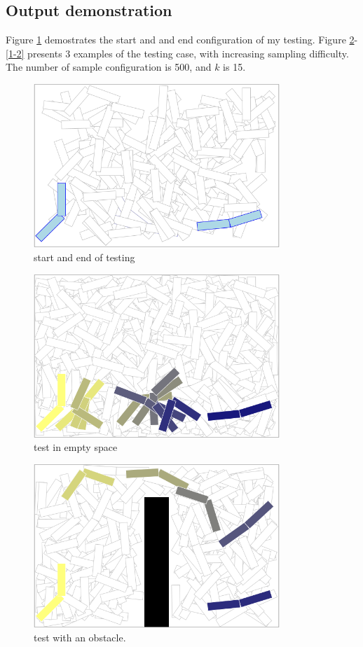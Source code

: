 \documentclass{article}
\begin{document}
\subsection{Output demonstration}
Figure \ref{startendrmp} demostrates the start and and end configuration of my testing. Figure \ref{1-0}-\ref{1-2} presents 3 examples of the testing case, with increasing sampling difficulty. The number of sample configuration is 500, and $k$ is 15.
\begin{figure}[!h]
\centering
\includegraphics[width=0.827\textwidth]{0-1.png}
\caption{start and end of testing}
\label{startendrmp}
\end{figure}

\begin{figure}[!h]
\centering
\includegraphics[width=0.827\textwidth]{1-0.png}
\caption{test in empty space}
\label{1-0}
\end{figure}

\begin{figure}[!h]
\centering
\includegraphics[width=0.827\textwidth]{1-1.png}
\caption{test with an obstacle.}
\label{1-1}
\end{figure}
\end{document}
